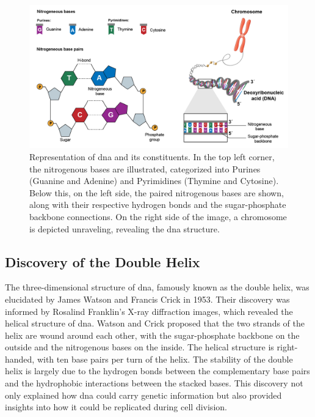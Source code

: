 \begin{figure}[H]
    \centering
    \includegraphics[width=1\textwidth]{figs/dna.png}
    \caption{Representation of \ac{dna} and its constituents. In the top left corner, the nitrogenous bases are illustrated, categorized into Purines (Guanine and Adenine) and Pyrimidines (Thymine and Cytosine). Below this, on the left side, the paired nitrogenous bases are shown, along with their respective hydrogen bonds and the sugar-phosphate backbone connections. On the right side of the image, a chromosome is depicted unraveling, revealing the \ac{dna} structure. \cite{DNA}} 
    \label{fig:dna}
\end{figure}

\subsection{Discovery of the Double Helix} \label{subsec:genetics_discovery}

The three-dimensional structure of \ac{dna}, famously known as the double helix, was elucidated by James Watson and Francis Crick in 1953. Their discovery was informed by Rosalind Franklin's X-ray diffraction images, which revealed the helical structure of \ac{dna}. Watson and Crick proposed that the two strands of the helix are wound around each other, with the sugar-phosphate backbone on the outside and the nitrogenous bases on the inside. The helical structure is right-handed, with ten base pairs per turn of the helix. The stability of the double helix is largely due to the hydrogen bonds between the complementary base pairs and the hydrophobic interactions between the stacked bases. This discovery not only explained how \ac{dna} could carry genetic information but also provided insights into how it could be replicated during cell division. \cite{Minchin2019}

